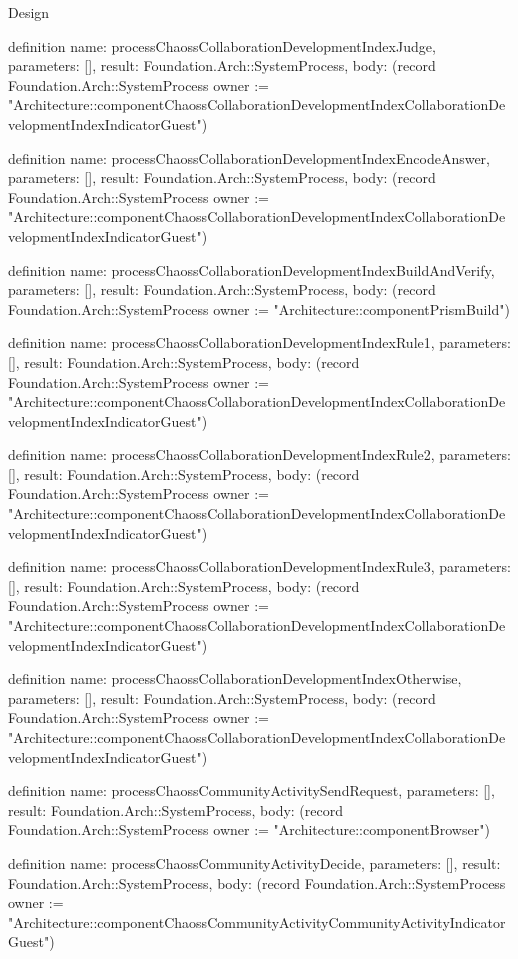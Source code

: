 \begin{lexlean}{Design}
\begin{semanticmodule}
definition{
  name: processChaossCollaborationDevelopmentIndexJudge,
  parameters: [],
  result: Foundation.Arch::SystemProcess,
  body: (record Foundation.Arch::SystemProcess {owner := "Architecture::componentChaossCollaborationDevelopmentIndexCollaborationDevelopmentIndexIndicatorGuest"})
}

definition{
  name: processChaossCollaborationDevelopmentIndexEncodeAnswer,
  parameters: [],
  result: Foundation.Arch::SystemProcess,
  body: (record Foundation.Arch::SystemProcess {owner := "Architecture::componentChaossCollaborationDevelopmentIndexCollaborationDevelopmentIndexIndicatorGuest"})
}

definition{
  name: processChaossCollaborationDevelopmentIndexBuildAndVerify,
  parameters: [],
  result: Foundation.Arch::SystemProcess,
  body: (record Foundation.Arch::SystemProcess {owner := "Architecture::componentPrismBuild"})
}

definition{
  name: processChaossCollaborationDevelopmentIndexRule1,
  parameters: [],
  result: Foundation.Arch::SystemProcess,
  body: (record Foundation.Arch::SystemProcess {owner := "Architecture::componentChaossCollaborationDevelopmentIndexCollaborationDevelopmentIndexIndicatorGuest"})
}

definition{
  name: processChaossCollaborationDevelopmentIndexRule2,
  parameters: [],
  result: Foundation.Arch::SystemProcess,
  body: (record Foundation.Arch::SystemProcess {owner := "Architecture::componentChaossCollaborationDevelopmentIndexCollaborationDevelopmentIndexIndicatorGuest"})
}

definition{
  name: processChaossCollaborationDevelopmentIndexRule3,
  parameters: [],
  result: Foundation.Arch::SystemProcess,
  body: (record Foundation.Arch::SystemProcess {owner := "Architecture::componentChaossCollaborationDevelopmentIndexCollaborationDevelopmentIndexIndicatorGuest"})
}

definition{
  name: processChaossCollaborationDevelopmentIndexOtherwise,
  parameters: [],
  result: Foundation.Arch::SystemProcess,
  body: (record Foundation.Arch::SystemProcess {owner := "Architecture::componentChaossCollaborationDevelopmentIndexCollaborationDevelopmentIndexIndicatorGuest"})
}

definition{
  name: processChaossCommunityActivitySendRequest,
  parameters: [],
  result: Foundation.Arch::SystemProcess,
  body: (record Foundation.Arch::SystemProcess {owner := "Architecture::componentBrowser"})
}

definition{
  name: processChaossCommunityActivityDecide,
  parameters: [],
  result: Foundation.Arch::SystemProcess,
  body: (record Foundation.Arch::SystemProcess {owner := "Architecture::componentChaossCommunityActivityCommunityActivityIndicatorGuest"})
}


\end{semanticmodule}
\end{lexlean}
